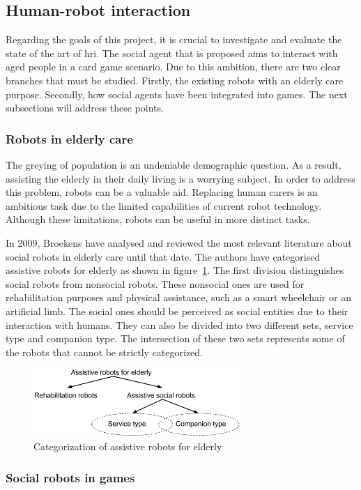 \subsection{Human-robot interaction}

Regarding the goals of this project, it is crucial to investigate and evaluate the state of the art of \gls{hri}.
The social agent that is proposed aims to interact with aged people in a card game scenario.
Due to this ambition, there are two clear branches that must be studied.
Firstly, the existing robots with an elderly care purpose.
Secondly, how social agents have been integrated into games.
The next subsections will address these points.



\subsubsection{Robots in elderly care}


The greying of population is an undeniable demographic question.
As a result, assisting the elderly in their daily living is a worrying subject.
In order to address this problem, robots can be a valuable aid.
Replacing human carers is an ambitious task due to the limited capabilities of current robot technology.
Although these limitations, robots can be useful in more distinct tasks.

In 2009, Broekens have analysed and reviewed the most relevant literature about social robots in elderly care until that date.
The authors have categorised assistive robots for elderly as shown in figure~\ref{fig:categorization}.
The first division distinguishes social robots from nonsocial robots.
These nonsocial ones are used for rehabilitation purposes and physical assistance, such as a smart wheelchair or an artificial limb.
The social ones should be perceived as social entities due to their interaction with humans.
They can also be divided into two different sets, service type and companion type.
The intersection of these two sets represents some of the robots that cannot be strictly categorized.

\begin{figure}[h!]
  \centering
    \includegraphics[width=0.7\textwidth]{./img/categorization_robots}
  \caption{Categorization of assistive robots for elderly}
\label{fig:categorization}
\end{figure}


\subsubsection{Social robots in games}
